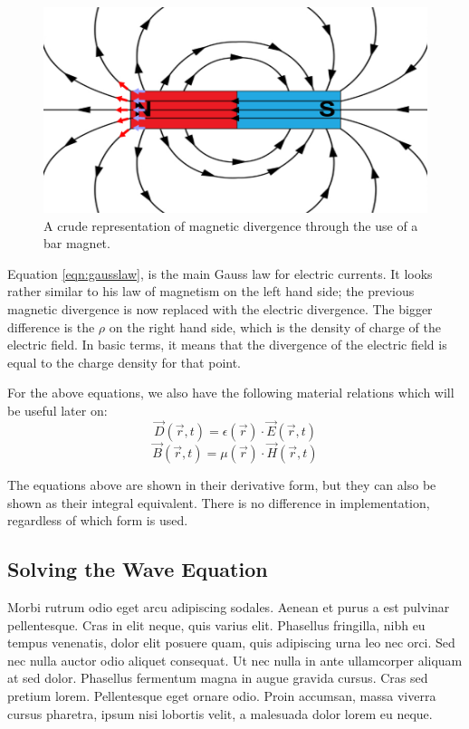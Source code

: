 \begin{figure}
	\centering
	\includegraphics[scale=0.9]{Figures/magneticdivergence}
	\decoRule
	\caption[Magnetic Divergence]{A crude representation of magnetic divergence through the use of a bar magnet.}
	\label{fig:magneticdivergence}
\end{figure}

Equation \ref{eqn:gausslaw}, is the main Gauss law for electric currents. It looks rather similar to his law of magnetism on the left hand side; the previous magnetic divergence is now replaced with the electric divergence. The bigger difference is the $\rho$ on the right hand side, which is the density of charge of the electric field. In basic terms, it means that the divergence of the electric field is equal to the charge density for that point.

For the above equations, we also have the following material relations which will be useful later on:
\begin{equation}
	 \vec{D}(\vec{r},t) = \epsilon(\vec{r}) \cdot \vec{E}(\vec{r},t)
\end{equation}
\begin{equation}
	\vec{B}(\vec{r},t) = \mu(\vec{r}) \cdot \vec{H}(\vec{r},t)
\end{equation}

The equations above are shown in their derivative form, but they can also be shown as their integral equivalent. There is no difference in implementation, regardless of which form is used.


\subsection{Solving the Wave Equation}
Morbi rutrum odio eget arcu adipiscing sodales. Aenean et purus a est pulvinar pellentesque. Cras in elit neque, quis varius elit. Phasellus fringilla, nibh eu tempus venenatis, dolor elit posuere quam, quis adipiscing urna leo nec orci. Sed nec nulla auctor odio aliquet consequat. Ut nec nulla in ante ullamcorper aliquam at sed dolor. Phasellus fermentum magna in augue gravida cursus. Cras sed pretium lorem. Pellentesque eget ornare odio. Proin accumsan, massa viverra cursus pharetra, ipsum nisi lobortis velit, a malesuada dolor lorem eu neque.

